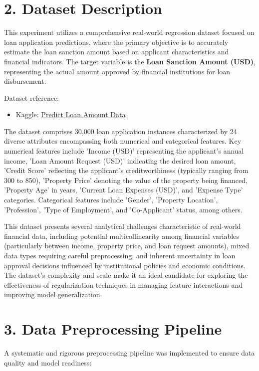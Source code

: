 \documentclass[11pt]{article}
\begin{document}
\section*{2. Dataset Description}
This experiment utilizes a comprehensive real-world regression dataset focused on loan application predictions, where the primary objective is to accurately estimate the loan sanction amount based on applicant characteristics and financial indicators. The target variable is the \textbf{Loan Sanction Amount (USD)}, representing the actual amount approved by financial institutions for loan disbursement.

Dataset reference:
\begin{itemize}
\item Kaggle: \href{https://www.kaggle.com/datasets/phileinsophos/predict-loan-amount-data}{Predict Loan Amount Data}
\end{itemize}

The dataset comprises 30,000 loan application instances characterized by 24 diverse attributes encompassing both numerical and categorical features. Key numerical features include 'Income (USD)' representing the applicant's annual income, 'Loan Amount Request (USD)' indicating the desired loan amount, 'Credit Score' reflecting the applicant's creditworthiness (typically ranging from 300 to 850), 'Property Price' denoting the value of the property being financed, 'Property Age' in years, 'Current Loan Expenses (USD)', and 'Expense Type' categories. Categorical features include 'Gender', 'Property Location', 'Profession', 'Type of Employment', and 'Co-Applicant' status, among others.

This dataset presents several analytical challenges characteristic of real-world financial data, including potential multicollinearity among financial variables (particularly between income, property price, and loan request amounts), mixed data types requiring careful preprocessing, and inherent uncertainty in loan approval decisions influenced by institutional policies and economic conditions. The dataset's complexity and scale make it an ideal candidate for exploring the effectiveness of regularization techniques in managing feature interactions and improving model generalization.

\section*{3. Data Preprocessing Pipeline}
A systematic and rigorous preprocessing pipeline was implemented to ensure data quality and model readiness:
\end{document}
